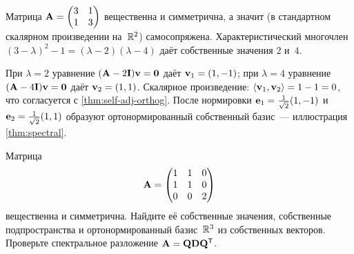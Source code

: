 \begin{example}
\label{ex:self-adj}
Матрица $\mathbf{A} = \begin{pmatrix} 3 & 1 \\ 1 & 3 \end{pmatrix}$
вещественна и симметрична, а значит (в стандартном скалярном
произведении на~$\mathbb{R}^2$) самосопряжена. Характеристический многочлен
$(3 - \lambda)^2 - 1 = (\lambda - 2)(\lambda - 4)$ даёт собственные
значения $2$ и~$4$.

При $\lambda = 2$ уравнение $(\mathbf{A} - 2\mathbf{I})\mathbf{v} = \mathbf{0}$
даёт $\mathbf{v}_1 = (1, -1)$; при $\lambda = 4$ уравнение
$(\mathbf{A} - 4\mathbf{I})\mathbf{v} = \mathbf{0}$ даёт $\mathbf{v}_2 = (1, 1)$.
Скалярное произведение: $\langle \mathbf{v}_1, \mathbf{v}_2 \rangle = 1 - 1 = 0$,
что согласуется с \cref{thm:self-adj-orthog}. После нормировки
$\mathbf{e}_1 = \tfrac{1}{\sqrt{2}}(1, -1)$ и
$\mathbf{e}_2 = \tfrac{1}{\sqrt{2}}(1, 1)$ образуют ортонормированный
собственный базис~--- иллюстрация \cref{thm:spectral}.
\end{example}

\begin{problem}
\label{prob:spectral-3x3}
Матрица
\[
  \mathbf{A} = \begin{pmatrix}
    1 & 1 & 0 \\
    1 & 1 & 0 \\
    0 & 0 & 2
  \end{pmatrix}
\]
вещественна и симметрична. Найдите её собственные значения,
собственные подпространства и ортонормированный базис~$\mathbb{R}^3$ из
собственных векторов. Проверьте спектральное разложение
$\mathbf{A} = \mathbf{Q}\mathbf{D}\mathbf{Q}^{\mathsf{T}}$.
\end{problem}

